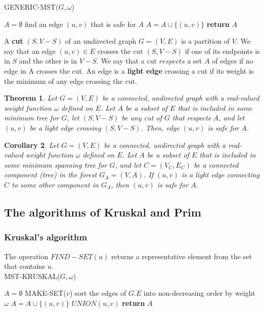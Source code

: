 \documentclass[12pt]{article}
\newtheorem{theorem}{Theorem}
\newtheorem{corollary}[theorem]{Corollary}
\begin{document}
GENERIC-MST($G, \omega$)
\begin{algorithmic} [1]
\State $A = \emptyset$
	\State find an edge $(u,v)$ that is safe for $A$
	\State $A = A \cup \{ (u,v) \}$
\EndWhile
\State \textbf{return } $A$
\end{algorithmic}

A \textbf{cut} $(S, V-S)$ of an undirected graph $G = (V,E)$ is a partition of $V$. We say that an edge $(u,v) \in E$ crosses the cut $(S, V-S)$ if one of its endpoints is in $S$ and the other is in $V-S$. We say that a cut $respects$ a set $A$ of edges if no edge in A crosses the cut. An edge is a \textbf{light edge} crossing a cut if its weight is the minimum of any edge crossing the cut.

\begin{theorem}
  Let $G = (V,E)$ be a connected, undirected graph with a real-valued weight function $\omega$ defined on $E$. Let $A$ be a subset of $E$ that is included in some minimum tree for $G$, let $(S, V-S)$ be any cut of $G$ that respects $A$, and let $(u,v)$ be a light edge crossing $(S, V-S)$. Then, edge $(u,v)$ is safe for $A$.
\end{theorem}

\begin{corollary}
  Let $G = (V,E)$ be a connected, undirected graph with a real-valued weight function $\omega$ defined on $E$. Let $A$ be a subset of $E$ that is included in some minimum spanning tree for $G$, and let $C = (V_C, E_C)$ be a connected component (tree) in the forest $G_A = (V, A)$. If $(u,v)$ is a light edge connecting $C$ to some other component in $G_A$, then $(u,v)$ is safe for $A$.
\end{corollary}

\subsection{The algorithms of Kruskal and Prim}

\subsubsection*{Kruskal's algorithm}

The operation $FIND-SET(u)$ returns a representative element from the set that contains $u$. \\

MST-KRUSKAL($G, \omega$)
\begin{algorithmic} [1]
\State $A = \emptyset$
	\State MAKE-SET($v$)
\EndFor
\State sort the edges of $G.E$ into non-decreasing order by weight $\omega$
        	\State $A = A \cup \{ (u,v) \}$
		\State $UNION(u,v)$
	\EndIf
\EndFor
\State \textbf{return } $A$
\end{algorithmic}
\end{document}
